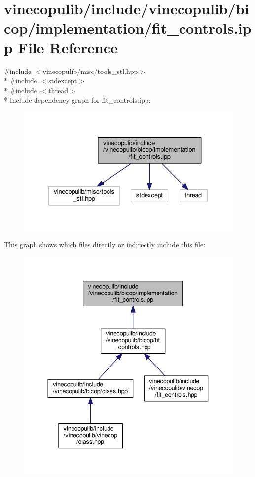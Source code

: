\hypertarget{bicop_2implementation_2fit__controls_8ipp}{}\section{vinecopulib/include/vinecopulib/bicop/implementation/fit\+\_\+controls.ipp File Reference}
\label{bicop_2implementation_2fit__controls_8ipp}
{\ttfamily \#include $<$vinecopulib/misc/tools\+\_\+stl.\+hpp$>$}\\*
{\ttfamily \#include $<$stdexcept$>$}\\*
{\ttfamily \#include $<$thread$>$}\\*
Include dependency graph for fit\+\_\+controls.\+ipp\+:
\nopagebreak
\begin{figure}[H]
\begin{center}
\leavevmode
\includegraphics[width=333pt]{bicop_2implementation_2fit__controls_8ipp__incl}
\end{center}
\end{figure}
This graph shows which files directly or indirectly include this file\+:
\nopagebreak
\begin{figure}[H]
\begin{center}
\leavevmode
\includegraphics[width=344pt]{bicop_2implementation_2fit__controls_8ipp__dep__incl}
\end{center}
\end{figure}
